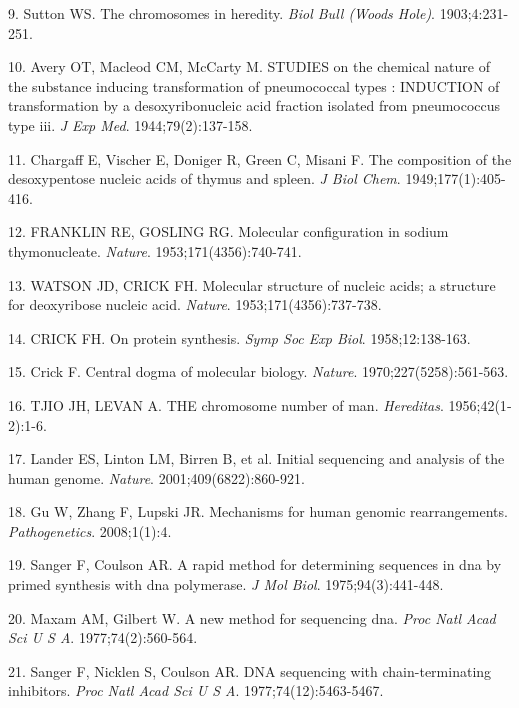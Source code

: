 \documentclass[11pt,letterpaper]{book}
\begin{document}
\leavevmode\hypertarget{ref-sutton:1903aa}{}%
9. Sutton WS. The chromosomes in heredity. \emph{Biol Bull (Woods Hole)}. 1903;4:231-251.

\leavevmode\hypertarget{ref-avery:1944aa}{}%
10. Avery OT, Macleod CM, McCarty M. STUDIES on the chemical nature of the substance inducing transformation of pneumococcal types : INDUCTION of transformation by a desoxyribonucleic acid fraction isolated from pneumococcus type iii. \emph{J Exp Med}. 1944;79(2):137-158.

\leavevmode\hypertarget{ref-chargaff:1949aa}{}%
11. Chargaff E, Vischer E, Doniger R, Green C, Misani F. The composition of the desoxypentose nucleic acids of thymus and spleen. \emph{J Biol Chem}. 1949;177(1):405-416.

\leavevmode\hypertarget{ref-franklin:1953aa}{}%
12. FRANKLIN RE, GOSLING RG. Molecular configuration in sodium thymonucleate. \emph{Nature}. 1953;171(4356):740-741.

\leavevmode\hypertarget{ref-watson:1953aa}{}%
13. WATSON JD, CRICK FH. Molecular structure of nucleic acids; a structure for deoxyribose nucleic acid. \emph{Nature}. 1953;171(4356):737-738.

\leavevmode\hypertarget{ref-crick:1958aa}{}%
14. CRICK FH. On protein synthesis. \emph{Symp Soc Exp Biol}. 1958;12:138-163.

\leavevmode\hypertarget{ref-crick:1970aa}{}%
15. Crick F. Central dogma of molecular biology. \emph{Nature}. 1970;227(5258):561-563.

\leavevmode\hypertarget{ref-tjio:1956aa}{}%
16. TJIO JH, LEVAN A. THE chromosome number of man. \emph{Hereditas}. 1956;42(1‐2):1-6.

\leavevmode\hypertarget{ref-lander:2001aa}{}%
17. Lander ES, Linton LM, Birren B, et al. Initial sequencing and analysis of the human genome. \emph{Nature}. 2001;409(6822):860-921.

\leavevmode\hypertarget{ref-gu:2008aa}{}%
18. Gu W, Zhang F, Lupski JR. Mechanisms for human genomic rearrangements. \emph{Pathogenetics}. 2008;1(1):4.

\leavevmode\hypertarget{ref-sanger:1975aa}{}%
19. Sanger F, Coulson AR. A rapid method for determining sequences in dna by primed synthesis with dna polymerase. \emph{J Mol Biol}. 1975;94(3):441-448.

\leavevmode\hypertarget{ref-maxam:1977aa}{}%
20. Maxam AM, Gilbert W. A new method for sequencing dna. \emph{Proc Natl Acad Sci U S A}. 1977;74(2):560-564.

\leavevmode\hypertarget{ref-sanger:1977aa}{}%
21. Sanger F, Nicklen S, Coulson AR. DNA sequencing with chain-terminating inhibitors. \emph{Proc Natl Acad Sci U S A}. 1977;74(12):5463-5467.
\end{document}
